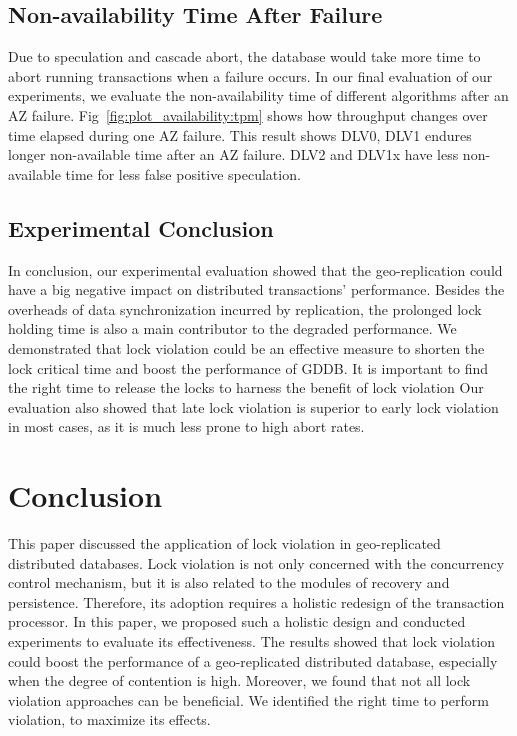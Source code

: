 \documentclass[conference]{IEEEtran}
\begin{document}
\subsection{Non-availability Time After Failure}

Due to speculation and cascade abort, the database would take more time to abort running transactions when a failure occurs.
In our final evaluation of our experiments, we evaluate the non-availability time of different algorithms after an AZ failure.
Fig~\ref{fig:plot_availability:tpm} shows how throughput changes over time elapsed during one AZ failure.
This result shows DLV0, DLV1 endures longer non-available time after an AZ failure.
DLV2 and DLV1x have less non-available time for less false positive speculation.


\subsection{Experimental Conclusion}

In conclusion, our experimental evaluation showed that the geo-replication could have a big negative impact on distributed transactions' performance.
Besides the overheads of data synchronization incurred by replication, the prolonged lock holding time is also a main contributor to the degraded performance.
We demonstrated that lock violation could be an effective measure to shorten the lock critical time and boost the performance of GDDB.
It is important to find the right time to release the locks  to harness the benefit of lock violation
Our evaluation also showed that late lock violation is superior to early lock violation in most cases, as it is much less prone to high abort rates.


\section{Conclusion}
\label{sec:conclusion}

This paper discussed the application of lock violation in geo-replicated distributed databases.
Lock violation is not only concerned with the concurrency control mechanism, but it is also related to the modules of recovery and persistence.
Therefore, its adoption requires a holistic redesign of the transaction processor. 
In this paper, we proposed such a holistic design and conducted experiments to evaluate its effectiveness.
The results showed that lock violation could boost the performance of a geo-replicated distributed database, especially when the degree of contention is high.
Moreover, we found that not all lock violation approaches can be beneficial. We identified the right time to perform violation, to maximize its effects. 
\end{document}
